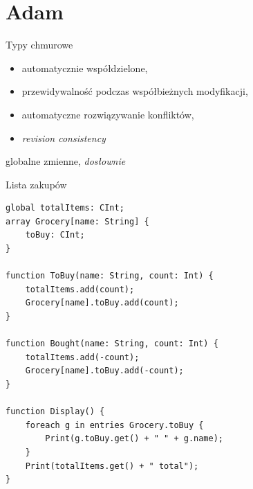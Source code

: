 \documentclass{beamer}
\begin{document}
\section{Adam}

\begin{frame}[fragile]{Typy chmurowe}
    \begin{card}
        \begin{itemize}[<+->]
            \item automatycznie współdzielone,
            \item przewidywalność podczas współbieżnych modyfikacji,
            \item automatyczne rozwiązywanie konfliktów,
            \item \textit{revision consistency}
        \end{itemize}
    \end{card}
     {
        \begin{card}
            globalne zmienne, \textit{dosłownie}
        \end{card}
    }
\end{frame}

\begin{frame}[fragile]{Lista zakupów}
    \begin{card}
        \begin{lstlisting}
global totalItems: CInt;
array Grocery[name: String] {
    toBuy: CInt;
}

function ToBuy(name: String, count: Int) {
    totalItems.add(count);
    Grocery[name].toBuy.add(count);
}

function Bought(name: String, count: Int) {
    totalItems.add(-count);
    Grocery[name].toBuy.add(-count);
}

function Display() {
    foreach g in entries Grocery.toBuy {
        Print(g.toBuy.get() + " " + g.name);
    }
    Print(totalItems.get() + " total");
}
        \end{lstlisting}
    \end{card}
\end{frame}
\end{document}
